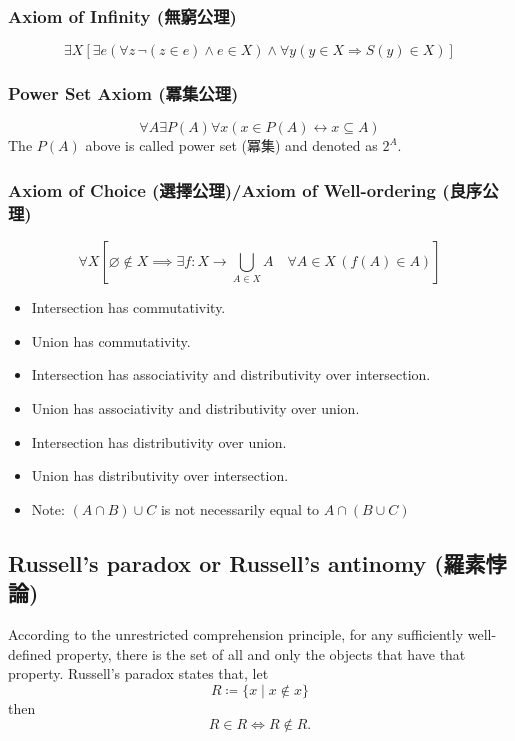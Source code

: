 \documentclass[a4paper,12pt]{article}
\begin{document}
\subsubsection{Axiom of Infinity (無窮公理)}
\[ \exists X\left[\exists e(\forall z\,\neg (z\in e)\land e\in X)\land \forall y(y\in X\Rightarrow S(y)\in X)\right]\]
\subsubsection{Power Set Axiom (冪集公理)}
\[\forall A \exists P(A) \forall x (x \in P(A) \leftrightarrow x \subseteq A)\]
The $P(A)$ above is called power set (冪集) and denoted as $2^A$.
\subsubsection{Axiom of Choice (選擇公理)/Axiom of Well-ordering (良序公理)}
\[ \forall X\left[\varnothing \notin X\implies \exists f\colon X\rightarrow \bigcup _{A\in X}A\quad \forall A\in X\,(f(A)\in A)\right]\]
\begin{itemize}
\item Intersection has commutativity.
\item Union has commutativity.
\item Intersection has associativity and distributivity over intersection.
\item Union has associativity and distributivity over union.
\item Intersection has distributivity over union.
\item Union has distributivity over intersection.
\item Note: $(A\cap B)\cup C$ is not necessarily equal to $A\cap (B\cup C)$
\end{itemize}
\subsection{Russell's paradox or Russell's antinomy (羅素悖論)}
According to the unrestricted comprehension principle, for any sufficiently well-defined property, there is the set of all and only the objects that have that property. Russell's paradox states that, let
\[R\coloneq\{x\mid x\not \in x\}\]
then
\[R\in R\iff R\not \in R.\]
\end{document}
